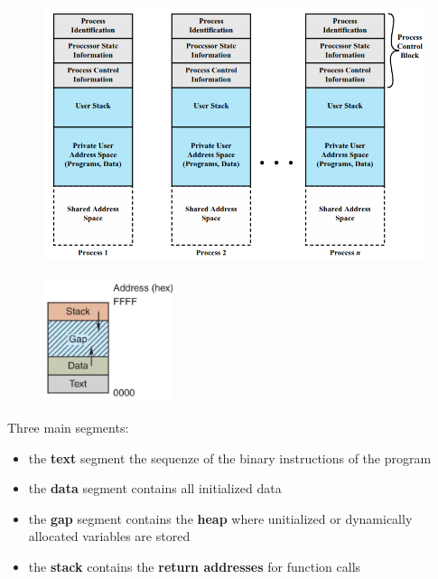 \documentclass[12pt, a4paper]{article}
\begin{document}
	
	\begin{figure}[!htbp]
		\centering
		\includegraphics[width=15cm]{SO_PNGs/process-image_SO.png}
		\caption*{}
		\label{fig:process-image}
	\end{figure}
	
	\begin{figure}
		\centering
		\includegraphics[width=3.8cm]{SO_PNGs/process-image-segments_SO.png}
		\caption*{}
		\label{fig:process-image-segments}
	\end{figure}
	
	Three main segments:
	\begin{itemize}
		\item the \textbf{text} segment the sequenze of the binary instructions of the program
		
		\item the \textbf{data} segment contains all initialized data
		
		\item the \textbf{gap} segment contains the \textbf{heap} where unitialized or dynamically allocated variables are stored
		
		\item the \textbf{stack} contains the \textbf{return addresses} for function calls
	\end{itemize}
\end{document}
